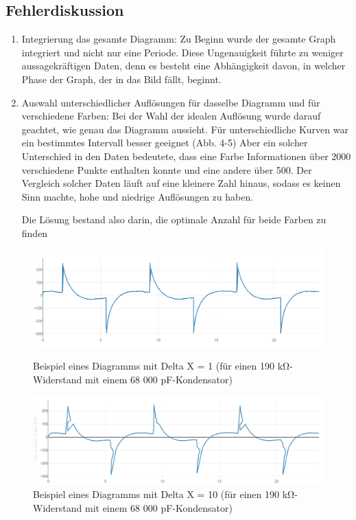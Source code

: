 \documentclass{article}
\begin{document}
\subsection{Fehlerdiskussion}
\begin{enumerate}
    \item Integrierung das gesamte Diagramm:   
Zu Beginn wurde der gesamte Graph integriert und nicht nur eine Periode. Diese Ungenauigkeit führte zu weniger aussagekräftigen Daten, denn es besteht eine Abhängigkeit davon, in welcher Phase der Graph, der in das Bild fällt, beginnt.
    \item Auswahl unterschiedlicher Auflösungen für dasselbe Diagramm und für verschiedene Farben: 
    Bei der Wahl der idealen Auflösung wurde darauf geachtet, wie genau das Diagramm aussieht. Für unterschiedliche Kurven war ein bestimmtes Intervall besser geeignet (Abb. 4-5)  Aber ein solcher Unterschied in den Daten bedeutete, dass eine Farbe Informationen über 2000 verschiedene Punkte enthalten konnte und eine andere über 500. Der Vergleich solcher Daten läuft auf eine kleinere Zahl hinaus, sodass es keinen Sinn machte, hohe und niedrige Auflösungen zu haben. 

    Die Lösung bestand also darin, die optimale Anzahl für beide Farben zu finden
\end{enumerate}

\begin{figure}[ht]
    \centering
    \includegraphics[width=\textwidth]{figures/1x-68kPf.png}
    \caption{Beispiel eines Diagramms mit Delta X = 1 (für einen 190 kΩ-Widerstand mit einem 68 000 pF-Kondensator)}
    \label{img:delta_x1}

    \includegraphics[width=\textwidth]{figures/10x-68kpF-190kOm.png}
    \caption{Beispiel eines Diagramms mit Delta X = 10 (für einen 190 kΩ-Widerstand mit einem 68 000 pF-Kondensator)}
    \label{img:delta_x10}
\end{figure}
\end{document}
